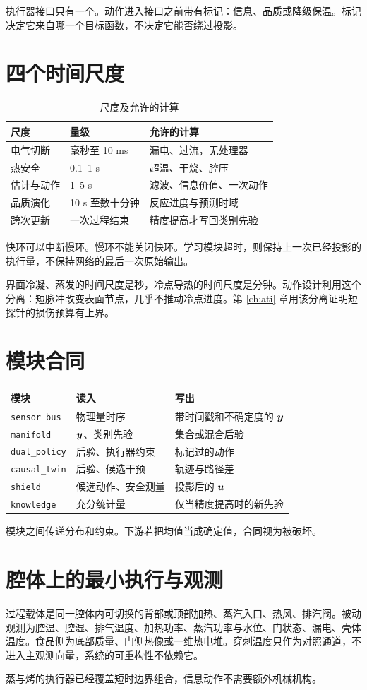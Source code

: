 执行器接口只有一个。动作进入接口之前带有标记：信息、品质或降级保温。标记决定它来自哪一个目标函数，不决定它能否绕过投影。

\section{四个时间尺度}

\begin{table}[H]
\centering
\caption{尺度及允许的计算}
\begin{tabularx}{\textwidth}{llX}
\toprule
尺度 & 量级 & 允许的计算 \\
\midrule
电气切断 & 毫秒至 10 ms & 漏电、过流，无处理器 \\
热安全 & 0.1--1 s & 超温、干烧、腔压 \\
估计与动作 & 1--5 s & 滤波、信息价值、一次动作 \\
品质演化 & 10 s 至数十分钟 & 反应进度与预测时域 \\
跨次更新 & 一次过程结束 & 精度提高才写回类别先验 \\
\bottomrule
\end{tabularx}
\end{table}

快环可以中断慢环。慢环不能关闭快环。学习模块超时，则保持上一次已经投影的执行量，不保持网络的最后一次原始输出。

界面冷凝、蒸发的时间尺度是秒，冷点导热的时间尺度是分钟。动作设计利用这个分离：短脉冲改变表面节点，几乎不推动冷点进度。第 \ref{ch:ati} 章用该分离证明短探针的损伤预算有上界。

\section{模块合同}

\begin{center}
\begin{tabularx}{\textwidth}{llX}
\toprule
模块 & 读入 & 写出 \\
\midrule
\texttt{sensor\_bus} & 物理量时序 & 带时间戳和不确定度的 $\bm{y}$ \\
\texttt{manifold} & $\bm{y}$、类别先验 & 集合或混合后验 \\
\texttt{dual\_policy} & 后验、执行器约束 & 标记过的动作 \\
\texttt{causal\_twin} & 后验、候选干预 & 轨迹与路径差 \\
\texttt{shield} & 候选动作、安全测量 & 投影后的 $\bm{u}$ \\
\texttt{knowledge} & 充分统计量 & 仅当精度提高时的新先验 \\
\bottomrule
\end{tabularx}
\end{center}

模块之间传递分布和约束。下游若把均值当成确定值，合同视为被破坏。

\section{腔体上的最小执行与观测}

过程载体是同一腔体内可切换的背部或顶部加热、蒸汽入口、热风、排汽阀。被动观测为腔温、腔湿、排气温度、加热功率、蒸汽功率与水位、门状态、漏电、壳体温度。食品侧为底部质量、门侧热像或一维热电堆。穿刺温度只作为对照通道，不进入主观测向量，系统的可重构性不依赖它。

蒸与烤的执行器已经覆盖短时边界组合，信息动作不需要额外机械机构。
